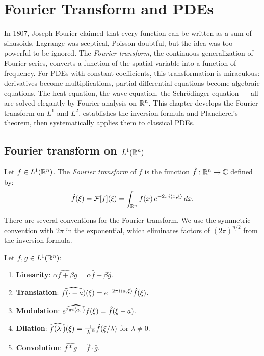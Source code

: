\chapter{Fourier Transform and PDEs}
\label{ch:fourier_transform}

In 1807, Joseph Fourier claimed that every function can be written as a sum of sinusoids. Lagrange was sceptical, Poisson doubtful, but the idea was too powerful to be ignored. The \emph{Fourier transform}, the continuous generalization of Fourier series, converts a function of the spatial variable into a function of frequency. For PDEs with constant coefficients, this transformation is miraculous: derivatives become multiplications, partial differential equations become algebraic equations. The heat equation, the wave equation, the Schr\"odinger equation --- all are solved elegantly by Fourier analysis on $\mathbb{R}^n$. This chapter develops the Fourier transform on $L^1$ and $L^2$, establishes the inversion formula and Plancherel's theorem, then systematically applies them to classical PDEs.

\section{Fourier transform on $L^1(\mathbb{R}^n)$}

\begin{definition}
Let $f \in L^1(\mathbb{R}^n)$. The \emph{Fourier transform} of $f$ is the function
$\hat{f} : \mathbb{R}^n \to \mathbb{C}$ defined by:
\[
    \hat{f}(\xi) = \mathcal{F}[f](\xi) = \int_{\mathbb{R}^n} f(x)\, e^{-2\pi i \langle x, \xi \rangle} \, dx.
\]
\end{definition}

\begin{remark}
There are several conventions for the Fourier transform. We use the symmetric
convention with $2\pi$ in the exponential, which eliminates factors of
$(2\pi)^{n/2}$ from the inversion formula.
\end{remark}

\begin{proposition}
\label{prop:fourier_properties}
Let $f, g \in L^1(\mathbb{R}^n)$:
\begin{enumerate}
    \item \textbf{Linearity}: $\widehat{\alpha f + \beta g} = \alpha \hat{f} + \beta \hat{g}$.
    \item \textbf{Translation}: $\widehat{f(\cdot - a)}(\xi) = e^{-2\pi i \langle a, \xi \rangle} \hat{f}(\xi)$.
    \item \textbf{Modulation}: $\widehat{e^{2\pi i \langle a, \cdot \rangle} f}(\xi) = \hat{f}(\xi - a)$.
    \item \textbf{Dilation}: $\widehat{f(\lambda \cdot)}(\xi) = \frac{1}{\left| \lambda \right|^n} \hat{f}(\xi/\lambda)$ for $\lambda \neq 0$.
    \item \textbf{Convolution}: $\widehat{f * g} = \hat{f} \cdot \hat{g}$.
\end{enumerate}
\end{proposition}

